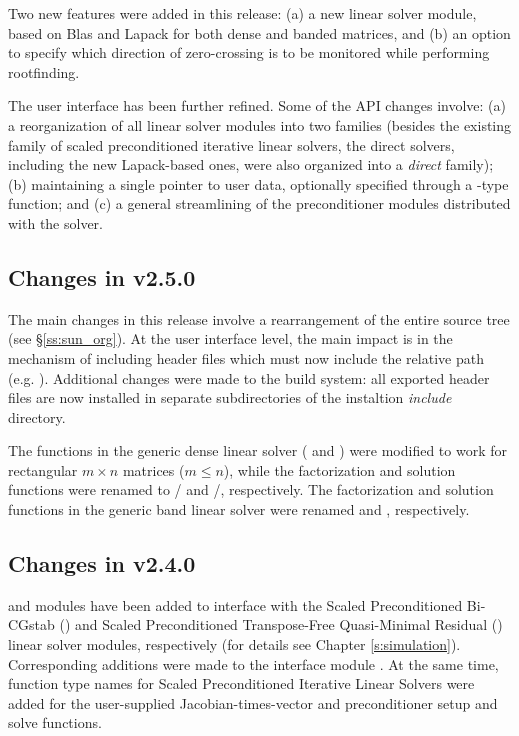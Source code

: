 Two new features were added in this release: (a) a new linear solver module,
based on Blas and Lapack for both dense and banded matrices, and (b) an option
to specify which direction of zero-crossing is to be monitored while performing
rootfinding. 

The user interface has been further refined. Some of the API changes involve:
(a) a reorganization of all linear solver modules into two families (besides 
the existing family of scaled preconditioned iterative linear solvers,
the direct solvers, including the new Lapack-based ones, were also organized 
into a {\em direct} family); (b) maintaining a single pointer to user data,
optionally specified through a -type function; and (c) a general 
streamlining of the preconditioner modules distributed with the solver.

\subsection*{Changes in v2.5.0}

The main changes in this release involve a rearrangement of the entire 
{\sundials} source tree (see \S\ref{ss:sun_org}). At the user interface 
level, the main impact is in the mechanism of including {\sundials} header
files which must now include the relative path (e.g. ).
Additional changes were made to the build system: all exported header files are
now installed in separate subdirectories of the instaltion {\em include} directory.

The functions in the generic dense linear solver ( and
) were modified to work for rectangular $m \times n$
matrices ($m \le n$), while the factorization and solution functions were
renamed to / and /, 
respectively.
The factorization and solution functions in the generic band linear solver were 
renamed  and , respectively.

\subsection*{Changes in v2.4.0}

{\cvspbcg} and {\cvsptfqmr} modules have been added to interface with the
Scaled Preconditioned Bi-CGstab ({\spbcg}) and Scaled Preconditioned
Transpose-Free Quasi-Minimal Residual ({\sptfqmr}) linear solver modules,
respectively (for details see Chapter \ref{s:simulation}). Corresponding
additions were made to the {\F} interface module {\fcvode}.
At the same time, function type names for Scaled Preconditioned Iterative
Linear Solvers were added for the user-supplied Jacobian-times-vector and
preconditioner setup and solve functions.


